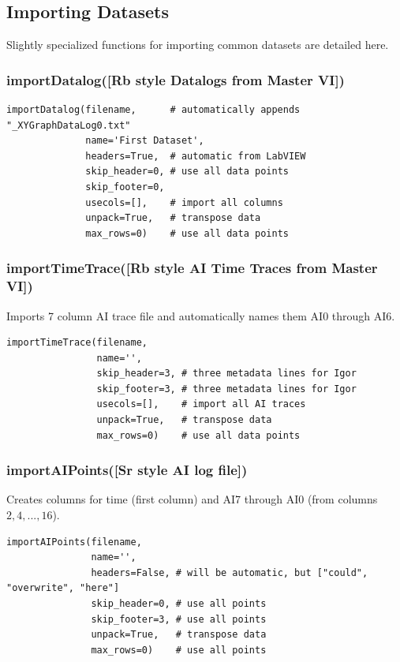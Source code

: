\documentclass[10pt]{report}
\begin{document}
\clearpage
\subsection*{Importing Datasets}
Slightly specialized functions for importing common datasets are detailed here.
\subsubsection*{\textbf{importDatalog}({\color{args}[Rb style Datalogs from Master VI]})}


\begin{lstlisting}[caption=importDatalog]
importDatalog(filename,      # automatically appends "_XYGraphDataLog0.txt"
              name='First Dataset',
              headers=True,  # automatic from LabVIEW
              skip_header=0, # use all data points
              skip_footer=0,
              usecols=[],    # import all columns
              unpack=True,   # transpose data
              max_rows=0)    # use all data points
\end{lstlisting}


\subsubsection*{\textbf{importTimeTrace}({\color{args}[Rb style AI Time Traces from Master VI]})}
Imports 7 column AI trace file and automatically names them AI0 through AI6.
\begin{lstlisting}[caption=importTimeTrace]
importTimeTrace(filename,
                name='',
                skip_header=3, # three metadata lines for Igor
                skip_footer=3, # three metadata lines for Igor
                usecols=[],    # import all AI traces
                unpack=True,   # transpose data
                max_rows=0)    # use all data points
\end{lstlisting}


\subsubsection*{\textbf{importAIPoints}({\color{args}[Sr style AI log file]})}
Creates columns for time (first column) and AI7 through AI0 (from columns $2, 4, ..., 16$).
\begin{lstlisting}[caption=importAIPoints]
importAIPoints(filename,
               name='',
               headers=False, # will be automatic, but ["could", "overwrite", "here"]
               skip_header=0, # use all points
               skip_footer=3, # use all points
               unpack=True,   # transpose data
               max_rows=0)    # use all points
\end{lstlisting}
\end{document}
